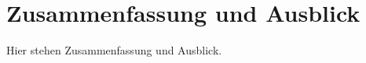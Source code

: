
\chapter{Zusammenfassung und Ausblick}
\label{chapter:conclusion}

Hier stehen Zusammenfassung und Ausblick.